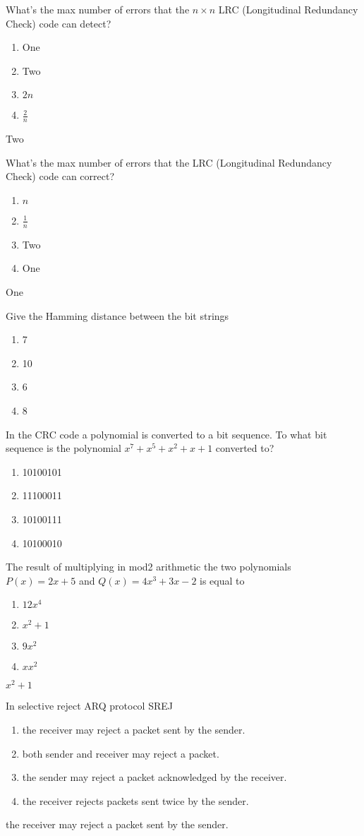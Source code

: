 \documentclass[a4 paper]{article}
\begin{document}
What's the max number of errors that the $n\times n$ LRC (Longitudinal Redundancy Check) code can detect?
\begin{enumerate}
	\item One
	\item Two
	\item $2n$
	\item $\frac{2}{n}$
\end{enumerate}
\solution Two

What's the max number of errors that the LRC (Longitudinal Redundancy Check) code can correct?
\begin{enumerate}
	\item $n$
	\item $\frac{1}{n}$
	\item Two
	\item One
\end{enumerate}
\solution One

Give the Hamming distance between the bit strings
\begin{enumerate}
	\item 7
	\item 10
	\item 6
	\item 8
\end{enumerate}

In the CRC code a polynomial is converted to a bit sequence. To what bit sequence is the polynomial $x^{7}+x^{5}+x^{2}+x+1$ converted to?
\begin{enumerate}
	\item 10100101
	\item 11100011
	\item 10100111
	\item 10100010
\end{enumerate}

The result of multiplying in mod2 arithmetic the two polynomials $P(x)=2x+5$ and $Q(x)=4x^{3}+3x-2$ is equal to
\begin{enumerate}
	\item $12x^{4}$
	\item $x^{2}+1$
	\item $9x^{2}$
	\item $xx^{2}$
\end{enumerate}
\solution $x^{2}+1$

In selective reject ARQ protocol SREJ
\begin{enumerate}
	\item the receiver may reject a packet sent by the sender.
	\item both sender and receiver may reject a packet.
	\item the sender may reject a packet acknowledged by the receiver.
	\item the receiver rejects packets sent twice by the sender.
\end{enumerate}
\solution the receiver may reject a packet sent by the sender.
\end{document}
